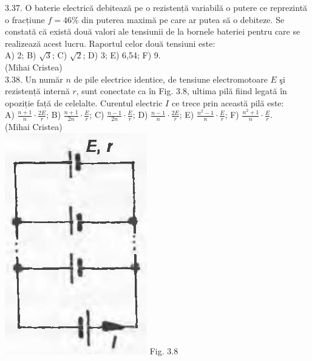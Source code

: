 \documentclass[10pt]{article}
\begin{document}
3.37. O baterie electrică debitează pe o rezistență variabilă o putere ce reprezintă o fracțiune $f=46 \%$ din puterea maximă pe care ar putea să o debiteze. Se constată că există două valori ale tensiunii de la bornele bateriei pentru care se realizează acest lucru. Raportul celor două tensiuni este:\\ A) 2; B) $\sqrt{3}$; C) $\sqrt{2}$; D) 3; E) 6,54; F) 9.\\ (Mihai Cristea)\\

3.38. Un număr $n$ de pile electrice identice, de tensiune electromotoare $E$ şi rezistență internă $r$, sunt conectate ca în Fig. 3.8, ultima pilă fiind legată în opoziție față de celelalte. Curentul electric $I$ ce trece prin această pilă este:\\ A) $\frac{n+1}{n} \cdot \frac{2 E}{r}$; B) $\frac{n+1}{2 n} \cdot \frac{E}{r}$; C) $\frac{n-1}{2 n} \cdot \frac{E}{r}$; D) $\frac{n-1}{n} \cdot \frac{2 E}{r}$; E) $\frac{n^{2}-1}{n} \cdot \frac{E}{r}$; F) $\frac{n^{2}+1}{n} \cdot \frac{E}{r}$.\\ (Mihai Cristea)\\ \includegraphics[max width=\textwidth, center]{2025_07_01_5b3ff9fa0d508c8e9f17g-151(1)} Fig. 3.8\\
\end{document}
